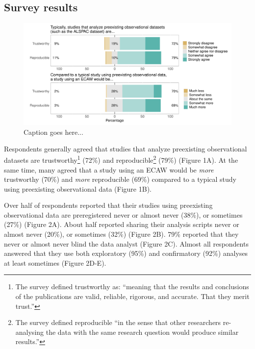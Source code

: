 \documentclass[
  man,floatsintext]{apa6}
\begin{document}
\hypertarget{survey-results}{%
\subsection{Survey results}\label{survey-results}}

\begin{figure}

{\centering \includegraphics[width=1\linewidth]{manuscript_files/figure-latex/typicallyEcawPlot-1} 

}

\caption{Caption goes here...}\label{fig:typicallyEcawPlot}
\end{figure}

Respondents generally agreed that studies that analyze preexisting observational datasets are trustworthy\footnote{The survey defined trustworthy as: ``meaning that the results and conclusions of the publications are valid, reliable, rigorous, and accurate. That they merit trust.''} (72\%) and reproducible\footnote{The survey defined reproducible ``in the sense that other researchers re-analysing the data with the same research question would produce similar results.''} (79\%) (Figure 1A). At the same time, many agreed that a study using an ECAW would be \emph{more} trustworthy (70\%) and \emph{more} reproducible (69\%) compared to a typical study using preexisting observational data (Figure 1B).

Over half of respondents reported that their studies using preexisting observational data are preregistered never or almost never (38\%), or sometimes (27\%) (Figure 2A). About half reported sharing their analysis scripts never or almost never (20\%), or sometimes (32\%) (Figure 2B). 79\% reported that they never or almost never blind the data analyst (Figure 2C). Almost all respondents answered that they use both exploratory (95\%) and confirmatory (92\%) analyses at least sometimes (Figure 2D-E).
\end{document}
